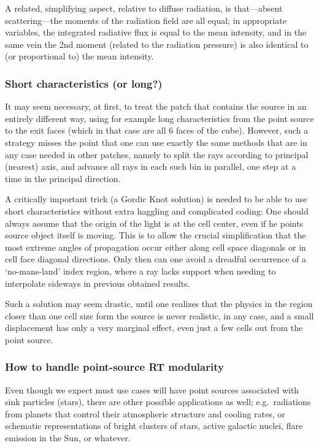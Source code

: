 \documentclass[paper=a4,fontsize=11pt]{scrartcl}
\numberwithin{equation}{section}		%
\numberwithin{figure}{section}			%
\numberwithin{table}{section}				%
\begin{document}
A related, simplifying aspect, relative to diffuse radiation, is that---absent scattering---the moments of the radiation field are all equal; in appropriate variables, the integrated radiative flux is equal to the mean intensity, and in the same vein the 2nd moment (related to the radiation pressure) is also identical to (or proportional to) the mean intensity.

\subsubsection{Short characteristics (or long?)}
It may seem necessary, at first, to treat the patch that contains the source in an entirely different way, using for example long characteristics from the point source to the exit faces (which in that case are all 6 faces of the cube).  However, such a strategy misses the point that one can use exactly the same methods that are in any case needed in other patches, namely to split the rays according to principal (nearest) axis, and advance all rays in each such bin in parallel, one step at a time in the principal direction.

A critically important trick (a Gordic Knot solution) is needed to be able to use short characteristics without extra haggling and complicated coding:  One should always assume that the origin of the light is at the cell center, even if he points source object itself is moving.  This is to allow the crucial simplification that the most extreme angles of propagation occur either along cell space diagonals or in cell face diagonal directions.  Only then can one avoid a dreadful occurrence of a `no-mans-land' index region, where a ray lacks support when needing to interpolate sideways in previous obtained results.

Such a solution may seem drastic, until one realizes that the physics in the region closer than one cell size form the source is never realistic, in any case, and a small displacement has only a very marginal effect, even just a few cells out from the point source.

\subsubsection{How to handle point-source RT modularity}
Even though we expect must use cases will have point sources associated with sink particles (stars), there are other possible applications as well; e.g.\ radiations from planets that control their atmospheric structure and cooling rates, or schematic representations of bright clusters of stars, active galactic nuclei, flare emission in the Sun, or whatever.
\end{document}

